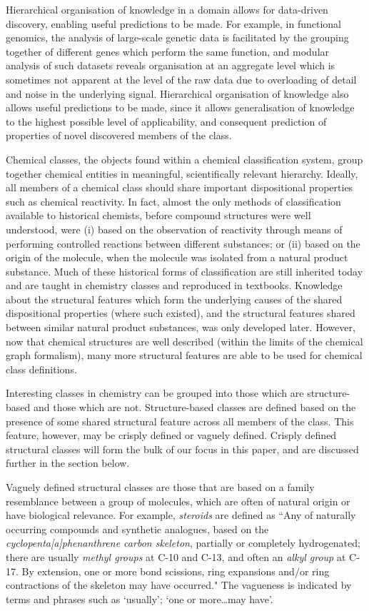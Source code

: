 \documentclass[10pt]{bmc_article}
\newenvironment{bmcformat}{\baselineskip20pt\sloppy\setboolean{publ}{false}}{\baselineskip20pt\sloppy}
\begin{document}
\begin{bmcformat}
Hierarchical organisation of knowledge in a domain allows for data-driven discovery, enabling useful predictions to be made.  For example, in functional genomics, the analysis of large-scale genetic data is facilitated by the grouping together of different genes which perform the same function, and modular analysis of such datasets reveals organisation at an aggregate level which is sometimes not apparent at the level of the raw data due to overloading of detail and noise in the underlying signal. Hierarchical organisation of knowledge also allows useful predictions to be made, since it allows generalisation of knowledge to the highest possible level of applicability, and consequent prediction of properties of novel discovered members of the class.  

Chemical classes, the objects found within a chemical classification system, group together chemical entities in meaningful, scientifically relevant hierarchy. Ideally, all members of a chemical class should share important dispositional properties such as chemical reactivity. In fact, almost the only methods of classification available to historical chemists, before compound structures were well understood, were (i) based on the observation of reactivity through means of performing controlled reactions between different substances; or (ii) based on the origin of the molecule, when the molecule was isolated from a natural product substance. Much of these historical forms of classification are still inherited today and are taught in chemistry classes and reproduced in textbooks. Knowledge about the structural features which form the underlying causes of the shared dispositional properties (where such existed), and the structural features shared between similar natural product substances, was only developed later. However, now that chemical structures are well described (within the limits of the chemical graph formalism), many more structural features are able to be used for chemical class definitions. 

Interesting classes in chemistry can be grouped into those which are structure-based and those which are not. Structure-based classes are defined based on the presence of some shared structural feature across all members of the class.  This feature, however, may be crisply defined or vaguely defined.  Crisply defined structural classes will form the bulk of our focus in this paper, and are discussed further in the section \textit{} below.   

Vaguely defined structural classes are those that are based on a family resemblance between a group of molecules, which are often of natural origin or have biological relevance.  For example, \textit{steroids} are defined as ``Any of naturally occurring compounds and synthetic analogues, based on the \textit{cyclopenta[a]phenanthrene carbon skeleton}, partially or completely hydrogenated; there are usually \textit{methyl groups} at C-10 and C-13, and often an \textit{alkyl group} at C-17. By extension, one or more bond scissions, ring expansions and/or ring contractions of the skeleton may have occurred."  The vagueness is indicated by terms and phrases such as `usually'; `one or more\ldots may have'.


\end{bmcformat}
\end{document}
